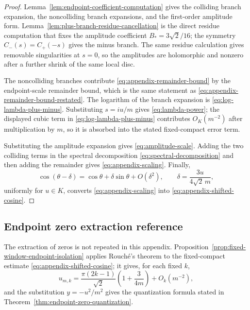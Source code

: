 \begin{proof}
Lemma~\ref{lem:endpoint-coefficient-computation} gives the colliding branch expansion, the noncolliding branch expansions, and the first-order amplitude form.  Lemma~\ref{lem:plus-branch-residue-cancellation} is the direct residue computation that fixes the amplitude coefficient \(B_*=3\sqrt2/16\); the symmetry \(C_-(s)=C_+(-s)\) gives the minus branch.  The same residue calculation gives removable singularities at \(s=0\), so the amplitudes are holomorphic and nonzero after a further shrink of the same local disc.

The noncolliding branches contribute \eqref{eq:appendix-remainder-bound} by the endpoint-scale remainder bound, which is the same statement as \eqref{eq:appendix-remainder-bound-restated}.  The logarithm of the branch expansion is \eqref{eq:log-lambda-plus-minus}.  Substituting \(s=iu/m\) gives \eqref{eq:lambda-power}; the displayed cubic term in \eqref{eq:log-lambda-plus-minus} contributes \(O_K(m^{-2})\) after multiplication by \(m\), so it is absorbed into the stated fixed-compact error term.

Substituting the amplitude expansion gives \eqref{eq:amplitude-scale}.  Adding the two colliding terms in the spectral decomposition \eqref{eq:spectral-decomposition} and then adding the remainder gives \eqref{eq:appendix-scaling}.  Finally,
\[
\cos(\theta-\delta)=\cos\theta+\delta\sin\theta+O(\delta^2),
\qquad
\delta=\frac{3u}{4\sqrt2\,m},
\]
uniformly for \(u\in K\), converts \eqref{eq:appendix-scaling} into \eqref{eq:appendix-shifted-cosine}.
\end{proof}
\subsection{Endpoint zero extraction reference}

The extraction of zeros is not repeated in this appendix.  Proposition~\ref{prop:fixed-window-endpoint-isolation} applies Rouch\'e's theorem to the fixed-compact estimate \eqref{eq:appendix-shifted-cosine}; it gives, for each fixed \(k\),
\[
u_{m,k}
=
\frac{\pi(2k-1)}{\sqrt2}\left(1+\frac{3}{4m}\right)+O_k(m^{-2}),
\]
and the substitution \(y=-u^2/m^2\) gives the quantization formula stated in Theorem~\ref{thm:endpoint-zero-quantization}.
